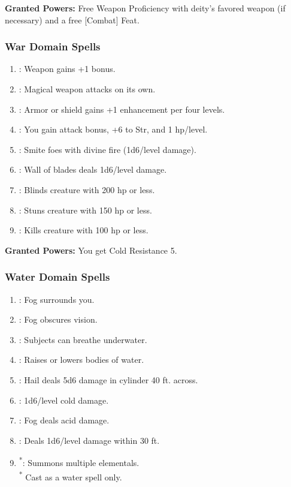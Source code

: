 \textbf{Granted Powers:} Free Weapon Proficiency with deity’s favored weapon (if necessary) and a free [Combat] Feat.
\subsubsection{War Domain Spells}
\begin{enumerate}
	\item{:} Weapon gains +1 bonus.
	\item{:} Magical weapon attacks on its own.
	\item{:} Armor or shield gains +1 enhancement per four levels.
	\item{:} You gain attack bonus, +6 to Str, and 1 hp/level.
	\item{:} Smite foes with divine fire (1d6/level damage).
	\item{:} Wall of blades deals 1d6/level damage.
	\item{:} Blinds creature with 200 hp or less.
	\item{:} Stuns creature with 150 hp or less.
	\item{:} Kills creature with 100 hp or less.
\end{enumerate}

\textbf{Granted Powers:} You get Cold Resistance 5.
\subsubsection{Water Domain Spells}
\begin{enumerate}
	\item{:} Fog surrounds you.
	\item{:} Fog obscures vision.
	\item{:} Subjects can breathe underwater.
	\item{:} Raises or lowers bodies of water.
	\item{:} Hail deals 5d6 damage in cylinder 40 ft. across.
	\item{:} 1d6/level cold damage.
	\item{:} Fog deals acid damage.
	\item{:} Deals 1d6/level damage within 30 ft.
	\item{\textsuperscript{*}:} Summons multiple elementals.
	\\ \textsuperscript{*} Cast as a water spell only.
\end{enumerate}